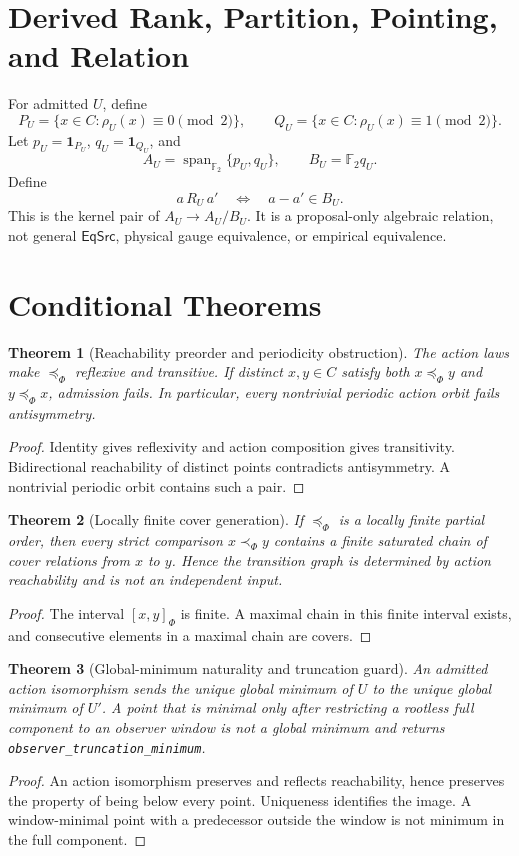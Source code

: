 \documentclass[11pt]{article}
\newtheorem{theorem}{Theorem}
\newcommand{\Ftwo}{\mathbb F_2}
\begin{document}
\section{Derived Rank, Partition, Pointing, and Relation}

For admitted \(U\), define
\[
 P_U=\{x\in C:\rho_U(x)\equiv0\pmod2\},
 \qquad
 Q_U=\{x\in C:\rho_U(x)\equiv1\pmod2\}.
\]
Let \(p_U=\mathbf1_{P_U}\), \(q_U=\mathbf1_{Q_U}\), and
\[
 A_U=\operatorname{span}_{\Ftwo}\{p_U,q_U\},
 \qquad
 B_U=\Ftwo q_U.
\]
Define
\[
 a\,R_U\,a'
 \quad\Longleftrightarrow\quad
 a-a'\in B_U.
\]
This is the kernel pair of \(A_U\to A_U/B_U\). It is a proposal-only
algebraic relation, not general \(\mathsf{EqSrc}\), physical gauge
equivalence, or empirical equivalence.

\section{Conditional Theorems}

\begin{theorem}[Reachability preorder and periodicity obstruction]
The action laws make \(\preceq_\Phi\) reflexive and transitive. If distinct
\(x,y\in C\) satisfy both \(x\preceq_\Phi y\) and
\(y\preceq_\Phi x\), admission fails. In particular, every nontrivial
periodic action orbit fails antisymmetry.
\end{theorem}
\begin{proof}
Identity gives reflexivity and action composition gives transitivity.
Bidirectional reachability of distinct points contradicts antisymmetry.
A nontrivial periodic orbit contains such a pair.
\end{proof}

\begin{theorem}[Locally finite cover generation]
If \(\preceq_\Phi\) is a locally finite partial order, then every strict
comparison \(x\prec_\Phi y\) contains a finite saturated chain of cover
relations from \(x\) to \(y\). Hence the transition graph is determined by
action reachability and is not an independent input.
\end{theorem}
\begin{proof}
The interval \([x,y]_\Phi\) is finite. A maximal chain in this finite
interval exists, and consecutive elements in a maximal chain are covers.
\end{proof}

\begin{theorem}[Global-minimum naturality and truncation guard]
An admitted action isomorphism sends the unique global minimum of \(U\) to
the unique global minimum of \(U'\). A point that is minimal only after
restricting a rootless full component to an observer window is not a global
minimum and returns \texttt{observer\_truncation\_minimum}.
\end{theorem}
\begin{proof}
An action isomorphism preserves and reflects reachability, hence preserves the
property of being below every point. Uniqueness identifies the image. A
window-minimal point with a predecessor outside the window is not minimum in
the full component.
\end{proof}
\end{document}
